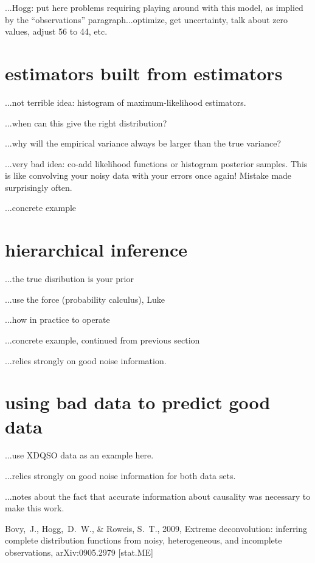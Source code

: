 \documentclass[12pt,twoside]{article}
\begin{document}
...Hogg: put here problems requiring playing around with this model,
as implied by the ``observations'' paragraph...optimize, get
uncertainty, talk about zero values, adjust 56 to 44, etc.

\section{estimators built from estimators}

...not terrible idea: histogram of maximum-likelihood estimators.

...when can this give the right distribution?

...why will the empirical variance always be larger than the true variance?

...very bad idea: co-add likelihood functions or histogram posterior
samples.  This is like convolving your noisy data with your errors
once again!  Mistake made surprisingly often.

...concrete example

\section{hierarchical inference}

...the true disribution is your prior

...use the force (probability calculus), Luke

...how in practice to operate

...concrete example, continued from previous section

...relies strongly on good noise information.

\section{using bad data to predict good data}

...use XDQSO data as an example here.

...relies strongly on good noise information for both data sets.

...notes about the fact that accurate information about causality was
necessary to make this work.

\clearpage
{}\theendnotes

\clearpage
\begin{thebibliography}{}
  Bovy,~J., Hogg,~D.~W., \& Roweis, S.~T., 2009,
  Extreme deconvolution: inferring complete distribution functions from noisy, heterogeneous, and incomplete observations, 
  arXiv:0905.2979 [stat.ME]
\end{thebibliography}
\end{document}
